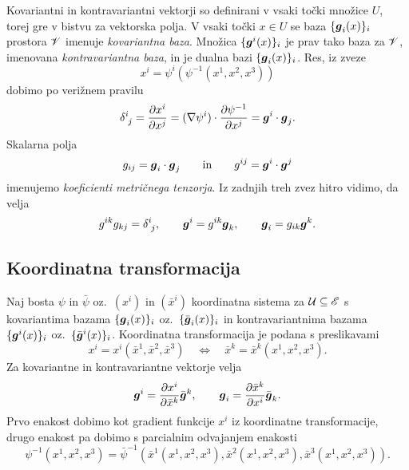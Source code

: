 Kovariantni in kontravariantni vektorji so definirani v vsaki točki množice $U$, torej
gre v bistvu za vektorska polja. V vsaki točki $x\in U$ se baza $\{\boldsymbol g_i(x)\}_i$ prostora $\mathscr V$
imenuje \emph{kovariantna baza}.
Množica $\{\boldsymbol g^i(x)\}_i$ je prav tako baza za $\mathscr V$, imenovana \emph{kontravariantna baza},
in je dualna bazi $\{\boldsymbol g_i(x)\}_i$. Res, iz zveze
\[ x^i=\psi^i(\psi^{-1}(x^1,x^2,x^3)) \]
dobimo po verižnem pravilu
\begin{equation} \label{e:gigj}
	\topbot{\delta}{i}{j}=\frac{\partial x^i}{\partial x^j}=
	(\nabla\psi^i)\cdot\frac{\partial\psi^{-1}}{\partial x^j}=\vek{g}^i\cdot\vek{g}_j.
\end{equation}
Skalarna polja
\[ g_{ij}=\boldsymbol g_i\cdot\boldsymbol g_j\qquad\textrm{in}\qquad g^{ij}=\boldsymbol g^i\cdot\boldsymbol g^j \]
imenujemo \emph{koeficienti metričnega tenzorja}. 
Iz zadnjih treh zvez hitro vidimo, da velja
\begin{equation} \label{e:relzag}
	g^{ik}g_{kj}=\topbot{\delta}{i}{j},\qquad \vek{g}^i=g^{ik}\vek{g}_k,\qquad \vek{g}_i=g_{ik}\vek{g}^k.
\end{equation}


\subsection{Koordinatna transformacija}


Naj bosta $\psi$ in $\bar{\psi}$ oz.~$(x^i)$ in $(\bar{x}^i)$ koordinatna sistema za
$\mathcal U\subseteq\mathscr E$ s kovariantima bazama $\{\boldsymbol g_i(x)\}_i$ oz.~$\{\bar{\boldsymbol g}_i(x)\}_i$
in kontravariantnima bazama $\{\boldsymbol g^i(x)\}_i$ oz.~$\{\bar{\boldsymbol g}^i(x)\}_i$.
Koordinatna transformacija je podana s preslikavami
\[
	x^i=x^i(\bar{x}^1,\bar{x}^2,\bar{x}^3)\quad\Longleftrightarrow\quad
	\bar{x}^k=\bar{x}^k(x^1,x^2,x^3).
\]
Za kovariantne in kontravariantne vektorje velja
\begin{equation} \label{e:gtog}
	\boldsymbol g^i=\frac{\partial x^i}{\partial\bar{x}^k}\bar{\boldsymbol g}^k,\qquad
	\boldsymbol g_i=\frac{\partial\bar{x}^k}{\partial x^i}\bar{\boldsymbol g}_k.
\end{equation}
Prvo enakost dobimo kot gradient funkcije $x^i$ iz koordinatne transformacije,
drugo enakost pa dobimo s parcialnim odvajanjem enakosti
\[ 
	\psi^{-1}(x^1,x^2,x^3)=\bar{\psi}^{-1}(\bar{x}^1(x^1,x^2,x^3),
	\bar{x}^2(x^1,x^2,x^3),\bar{x}^3(x^1,x^2,x^3)).
\]

